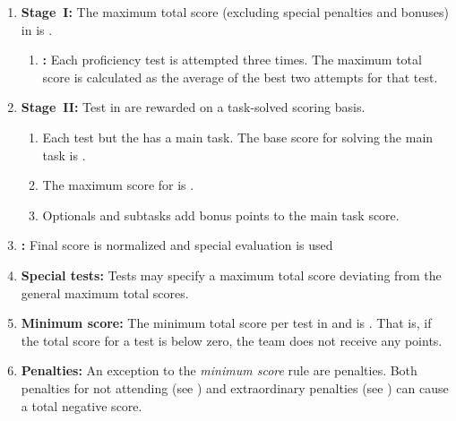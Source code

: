 \begin{enumerate}
	\item \textbf{Stage~I:} The maximum total score (excluding special penalties and bonuses) in  is .
	\begin{enumerate}
		\item \textbf{:} Each proficiency test is attempted three times. The maximum total score is calculated as the average of the best two attempts for that test.
	\end{enumerate}

	\item \textbf{Stage~II:} Test in  are rewarded on a task-solved scoring basis.
	\begin{enumerate}
		\item Each test but the  has a main task. The base score for solving the main task is .
		\item The maximum score for  is .
		\item Optionals and subtasks add bonus points to the main task score.
	\end{enumerate}

	\item \textbf{:} Final score is normalized and special evaluation is used

	\item \textbf{Special tests:} Tests may specify a maximum total score deviating from the general maximum total scores.

	\item \textbf{Minimum score:} The minimum total score per test in  and  is . That is, if the total score for a test is below zero, the team does not receive any points.

	\item \textbf{Penalties:} An exception to the \emph{minimum score} rule are penalties. Both penalties for not attending (see ) and extraordinary penalties (see ) can cause a total negative score. 


\end{enumerate}
